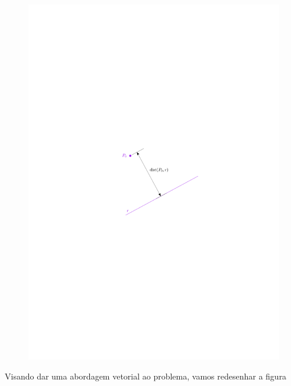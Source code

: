 \documentclass[a4paper, 12pt, brazilian]{article}
\begin{document}
	\begin{figure}[H]
		\centering
		\includegraphics[scale=1.1]{images/dist}
		\label{fig:dist}
	\end{figure}
	Visando dar uma abordagem vetorial ao problema, vamos redesenhar a figura
	
\end{document}
